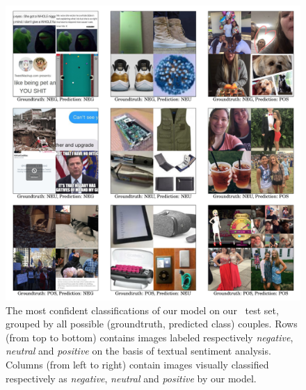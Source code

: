 \begin{figure}
\centering
\includegraphics[width=\linewidth]{confusion-images}
\caption{The most confident classifications of our model on our \BTSA\, test set, grouped by all possible (groundtruth, predicted class) couples. Rows (from top to bottom) contains images labeled respectively \emph{negative}, \emph{neutral} and \emph{positive} on the basis of textual sentiment analysis. Columns (from left to right) contain images visually classified respectively as \emph{negative}, \emph{neutral} and \emph{positive} by our model.
}
\label{fig:vsa:confusion-images}
\end{figure}


